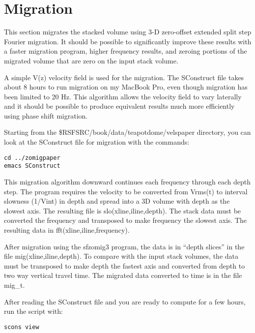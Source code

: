 

\section{Migration}

This section migrates the stacked volume using 3-D zero-offset extended split step Fourier migration.  It should be possible to significantly improve these results with a faster migration program, higher frequency results, and zeroing portions of the migrated volume that are zero on the input stack volume.

A simple V(z) velocity field is used for the migration.  The SConstruct file takes about 8 hours to run migration on my MacBook Pro, even though migration has been limited to 20 Hz.   This algorithm allows the velocity field to vary laterally and it should be possible to produce equivalent results much more efficiently using phase shift migration.
 
Starting from the \$RSFSRC/book/data/teapotdome/velspaper directory, you can look at the SConstruct file for migration with the commands:
\begin{verbatim}  
cd ../zomigpaper
emacs SConstruct
\end{verbatim}  

This migration algorithm downward continues each frequency through each depth step.  The program requires the velocity to be converted from Vrms(t) to interval slowness (1/Vint) in depth and spread into a 3D volume with depth as the slowest axis.  The resulting file is slo(xline,iline,depth).  The stack data must be converted the frequency and transposed to make frequency the slowest axis.  The resulting data in fft(xline,iline,frequency).  
 
After migration using the sfzomig3 program, the data is in “depth slices” in the file mig(xline,iline,depth).  To compare with the input stack volumes, the data must be transposed to make depth the fastest axis and converted from depth to two way vertical travel time.  The migrated data converted to time is in the file mig\_t.

After reading the SConstruct file and you are ready to compute for a few hours, run the script with:
\begin{verbatim}  
scons view
\end{verbatim}  

